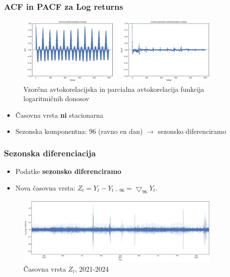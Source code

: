 \documentclass[14p, hyperref={unicode}]{beamer}
\begin{document}


\begin{frame}
    
    \frametitle{ACF in PACF za Log returns} 

    \begin{figure}[h!]
        \centering
        \caption{Vzorčna avtokorelacijska in parcialna avtokorelacija funkcija logaritmičnih donosov}\par\medskip
        \label{fig:log_returns_acf_pacf}
        \includegraphics[width=0.9\textwidth]{log_returns_acf_pacf.png}
    \end{figure}

    \begin{itemize}
        \item Časovna vrsta \textbf{ni} stacionarna
        \item Sezonska komponentna: 96 (ravno en dan) $\rightarrow$ sezonsko diferenciramo
    \end{itemize}
    
\end{frame}




\begin{frame}
    
    \frametitle{Sezonska diferenciacija} 

    \begin{itemize}
        \item Podatke \textbf{sezonsko diferenciramo}
        \item Nova časovna vrsta: $Z_t = Y_t - Y_{t-96} = \bigtriangledown_{96}Y_t$.
    \end{itemize}

    \begin{figure}[h!]
        \centering
        \caption{Časovna vrsta $Z_t$, 2021-2024}\par\medskip
        \label{fig:ts_diff}
        \includegraphics[width=0.9\textwidth]{ts_diff.png}
    \end{figure}

\end{frame}
\end{document}
